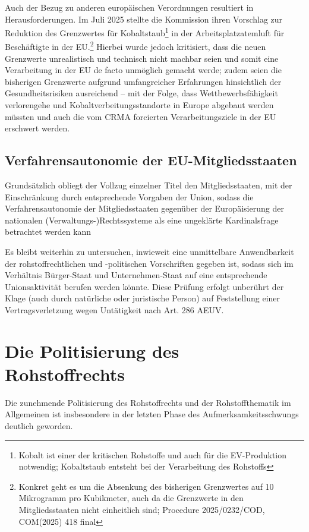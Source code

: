 \documentclass[12pt,a4paper,oneside]{book} %
\begin{document}
Auch der Bezug zu anderen europäischen Verordnungen resultiert in Herausforderungen. Im Juli 2025 stellte die Kommission ihren Vorschlag zur Reduktion des Grenzwertes für Kobaltstaub\footnote{Kobalt ist einer der kritischen Rohstoffe und auch für die EV-Produktion notwendig; Kobaltstaub entsteht bei der Verarbeitung des Rohstoffs} in der Arbeitsplatzatemluft für Beschäftigte in der EU.\footnote{Konkret geht es um die Absenkung des bisherigen Grenzwertes auf 10 Mikrogramm pro Kubikmeter, auch da die Grenzwerte in den Mitgliedsstaaten nicht einheitlich sind; Procedure 2025/0232/COD, COM(2025) 418 final} Hierbei wurde jedoch kritisiert, dass die neuen Grenzwerte unrealistisch und technisch nicht machbar seien und somit eine Verarbeitung in der EU de facto unmöglich gemacht werde; zudem seien die bisherigen Grenzwerte aufgrund umfangreicher Erfahrungen hinsichtlich der Gesundheitsrisiken ausreichend -- mit der Folge, dass Wettbewerbsfähigkeit verlorengehe und Kobaltverbeitungsstandorte in Europe abgebaut werden müssten und auch die vom CRMA forcierten Verarbeitungsziele in der EU erschwert werden.\autocite{Henke, Judith: Kobalt Handelsblatt, 10.4.2026}

\subsection{Verfahrensautonomie der EU-Mitgliedsstaaten}
Grundsätzlich obliegt der Vollzug einzelner Titel den Mitgliedsstaaten, mit der Einschränkung durch entsprechende Vorgaben der Union, sodass die Verfahrensautonomie der Mitgliedsstaaten gegenüber der  Europäisierung der nationalen (Verwaltungs-)Rechtssysteme als eine \glqq ungeklärte Kardinalsfrage\grqq \autocite{Ludiwgs, NVwZ 2018, 1417} betrachtet werden kann

Es bleibt weiterhin zu untersuchen, inwieweit eine unmittelbare Anwendbarkeit der rohstoffrechtlichen und -politischen Vorschriften gegeben ist, sodass sich im Verhältnis Bürger-Staat und Unternehmen-Staat auf eine entsprechende Unionsaktivität berufen werden könnte. Diese Prüfung erfolgt unberührt der Klage (auch durch natürliche oder juristische Person) auf Feststellung einer Vertragsverletzung wegen Untätigkeit nach Art. 286 AEUV.

\section{Die Politisierung des Rohstoffrechts}

Die zunehmende Politisierung des Rohstoffrechts und der Rohstoffthematik im Allgemeinen ist insbesondere in der letzten Phase des Aufmerksamkeitsschwungs deutlich geworden. 
\end{document}
